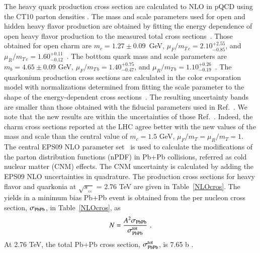 \documentclass[review]{elsarticle}
\begin{document}
The heavy quark production cross section are calculated to NLO in pQCD  
using the CT10 parton densities \cite{Lai:2010vv}. The mass and scale parameters used 
for open and hidden heavy flavor production are obtained by fitting the energy dependence 
of open heavy flavor production to the measured total cross sections~\cite{Nelson:2012bc,Nelson:Future}.
Those obtained for open charm are $m_c = 1.27 \pm 0.09$~GeV,
$\mu_F/m_{T\,c} = 2.10 ^{+2.55}_{-0.85}$, and $\mu_R/m_{T\, c} = 1.60 ^{+0.11}_{-0.12}$~\cite{Nelson:2012bc}. 
The botttom quark mass and scale parameters are $m_b = 4.65 \pm 0.09$ GeV,
$\mu_F/m_{T\, b} = 1.40^{+0.75}_{-0.47}$, and $\mu_R/m_{T\, b} = 1.10^{+0.26}_{-0.19}$~\cite{Nelson:Future}.
The quarkonium production cross sections are calculated in the color evaporation model with
normalizations determined from fitting the scale parameter to the shape of the energy-dependent
cross sections~\cite{Nelson:2012bc,Nelson:Future}. The resulting uncertainty bands are smaller 
than those obtained with the fiducial parameters used in Ref.~\cite{Cacciari:2005rk}.
We note that the new results are within the uncertainties of those Ref.~\cite{Cacciari:2005rk}.  
Indeed, the charm cross sections reported at the LHC agree
better with the new values of the mass and scale than the central value of $m_c = 1.5$ GeV,
$\mu_F/m_T = \mu_R/m_T = 1$. The central EPS09 NLO parameter set~\cite{Eskola:2009uj} is used to 
calculate the modifications of the parton distribution functions (nPDF) in 
Pb+Pb collisions, referred as cold nuclear matter (CNM) effects. The CNM uncertainty is 
calculated by adding the EPS09 NLO uncertainties in quadrature.%
The production cross sections for heavy flavor and quarkonia at $\sqrt{s_{_{_{NN}}}}$ = 2.76 
TeV \cite{Kumar:2012qx} are given in Table~\ref{NLOcros}.  The yields in a minimum bias 
Pb+Pb event is obtained from the per nucleon cross
section, $\sigma_{\rm PbPb}$, in Table~\ref{NLOcros}, as
\begin{eqnarray}
N = {A^2 \sigma_{\rm PbPb} \over  
\sigma_{\rm PbPb}^{\rm tot}} \, \, .
\end{eqnarray}
 At 2.76 TeV, the total Pb+Pb cross section, $\sigma_{\rm PbPb}^{\rm tot}$, 
is 7.65 b \cite{Chatrchyan:2011sx}.
\end{document}
